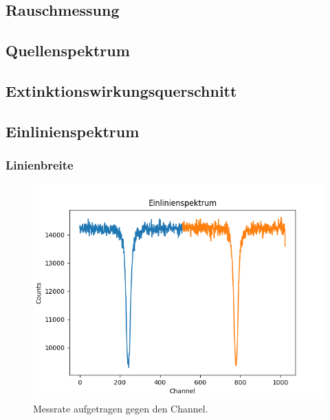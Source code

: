 \documentclass[12pt,a4paper]{article}
\begin{document}
\subsection{Rauschmessung}
\subsection{Quellenspektrum}
\subsection{Extinktionswirkungsquerschnitt}

\subsection{Einlinienspektrum}

\subsubsection{Linienbreite}
\begin{figure}
\centering
\includegraphics[scale=0.8]{Bilder/Einlinien/Ein_Rohdaten.png}
\caption{Messrate aufgetragen gegen den Channel.}
\label{fig:Ein_Roh}
\end{figure}
\end{document}

